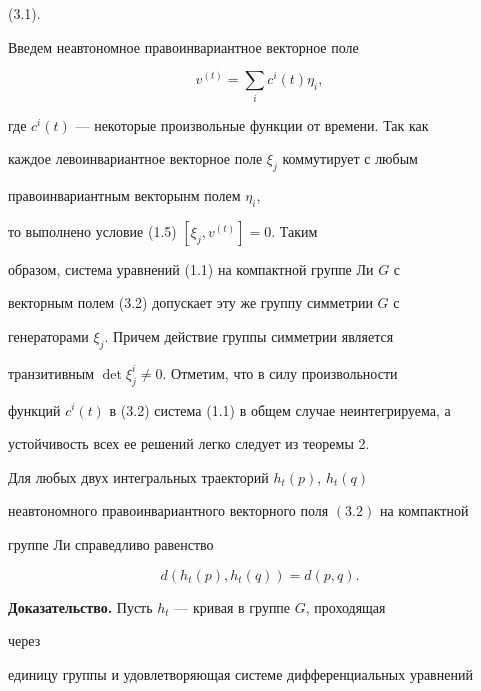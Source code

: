 (3.1). 


 


Введем неавтономное правоинвариантное векторное поле 


\begin{equation} 


v^{(t)}=\sum_i c^i(t)\eta_i, 


\end{equation} 


где $c^i(t)$ --- некоторые произвольные функции от времени. Так как 


каждое левоинвариантное векторное поле $\xi_j$ коммутирует с любым 


правоинвариантным векторынм полем $\eta_i$,


то выполнено условие (1.5) $[\xi_j,v^{(t)}]=0$. Таким 


образом, система уравнений (1.1) на компактной группе Ли $G$ с 


векторным полем (3.2) допускает эту же группу симметрии $G$ с 


генераторами $\xi_j$. Причем действие группы симметрии является 


транзитивным $\det\xi^i_j\ne 0$. Отметим, что в силу произвольности 


функций $c^i(t)$ в (3.2) система (1.1) в общем случае неинтегрируема, а 


устойчивость всех ее решений легко следует из теоремы 2. 


 


\begin{thm} 


Для любых двух интегральных траекторий $h_t(p)$, $h_t(q)$ 


неавтономного правоинвариантного векторного поля $(3.2)$ на компактной 


группе Ли справедливо равенство 


$$ 


d(h_t(p),h_t(q))=d(p,q). 


$$ 


\end{thm} 


 


{\bf Доказательство.} Пусть $h_t$ --- кривая в группе $G$, проходящая 


через 


единицу группы и удовлетворяющая системе дифференциальных уравнений 


